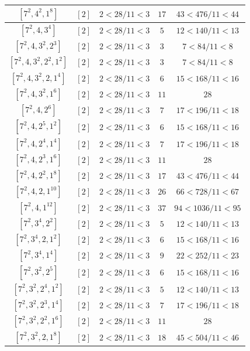\documentclass{article}%
\begin{document}
\begin{center}
\begin{longtable}{||c|c|c|c|c||}
$[7^{2}, 4^{2}, 1^{8}]$ & $[2]$ & $2 < 28/11 < 3$ & $17$ & $43 < 476/11 < 44$ \\ \hline 
$[7^{2}, 4, 3^{4}]$ & $[2]$ & $2 < 28/11 < 3$ & $5$ & $12 < 140/11 < 13$ \\ \hline 
$[7^{2}, 4, 3^{2}, 2^{3}]$ & $[2]$ & $2 < 28/11 < 3$ & $3$ & $7 < 84/11 < 8$ \\ \hline 
$[7^{2}, 4, 3^{2}, 2^{2}, 1^{2}]$ & $[2]$ & $2 < 28/11 < 3$ & $3$ & $7 < 84/11 < 8$ \\ \hline 
$[7^{2}, 4, 3^{2}, 2, 1^{4}]$ & $[2]$ & $2 < 28/11 < 3$ & $6$ & $15 < 168/11 < 16$ \\ \hline 
$[7^{2}, 4, 3^{2}, 1^{6}]$ & $[2]$ & $2 < 28/11 < 3$ & $11$ & $28$ \\ \hline 
$[7^{2}, 4, 2^{6}]$ & $[2]$ & $2 < 28/11 < 3$ & $7$ & $17 < 196/11 < 18$ \\ \hline 
$[7^{2}, 4, 2^{5}, 1^{2}]$ & $[2]$ & $2 < 28/11 < 3$ & $6$ & $15 < 168/11 < 16$ \\ \hline 
$[7^{2}, 4, 2^{4}, 1^{4}]$ & $[2]$ & $2 < 28/11 < 3$ & $7$ & $17 < 196/11 < 18$ \\ \hline 
$[7^{2}, 4, 2^{3}, 1^{6}]$ & $[2]$ & $2 < 28/11 < 3$ & $11$ & $28$ \\ \hline 
$[7^{2}, 4, 2^{2}, 1^{8}]$ & $[2]$ & $2 < 28/11 < 3$ & $17$ & $43 < 476/11 < 44$ \\ \hline 
$[7^{2}, 4, 2, 1^{10}]$ & $[2]$ & $2 < 28/11 < 3$ & $26$ & $66 < 728/11 < 67$ \\ \hline 
$[7^{2}, 4, 1^{12}]$ & $[2]$ & $2 < 28/11 < 3$ & $37$ & $94 < 1036/11 < 95$ \\ \hline 
$[7^{2}, 3^{4}, 2^{2}]$ & $[2]$ & $2 < 28/11 < 3$ & $5$ & $12 < 140/11 < 13$ \\ \hline 
$[7^{2}, 3^{4}, 2, 1^{2}]$ & $[2]$ & $2 < 28/11 < 3$ & $6$ & $15 < 168/11 < 16$ \\ \hline 
$[7^{2}, 3^{4}, 1^{4}]$ & $[2]$ & $2 < 28/11 < 3$ & $9$ & $22 < 252/11 < 23$ \\ \hline 
$[7^{2}, 3^{2}, 2^{5}]$ & $[2]$ & $2 < 28/11 < 3$ & $6$ & $15 < 168/11 < 16$ \\ \hline 
$[7^{2}, 3^{2}, 2^{4}, 1^{2}]$ & $[2]$ & $2 < 28/11 < 3$ & $5$ & $12 < 140/11 < 13$ \\ \hline 
$[7^{2}, 3^{2}, 2^{3}, 1^{4}]$ & $[2]$ & $2 < 28/11 < 3$ & $7$ & $17 < 196/11 < 18$ \\ \hline 
$[7^{2}, 3^{2}, 2^{2}, 1^{6}]$ & $[2]$ & $2 < 28/11 < 3$ & $11$ & $28$ \\ \hline 
$[7^{2}, 3^{2}, 2, 1^{8}]$ & $[2]$ & $2 < 28/11 < 3$ & $18$ & $45 < 504/11 < 46$ \\ \hline 

\end{longtable}
\end{center}
\end{document}
